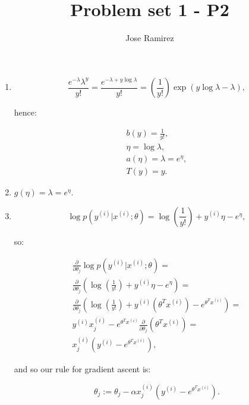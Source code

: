 \documentclass{article}
\title{Problem set 1 - P2}
\author{Jose Ramirez}
\begin{document}
\maketitle

\begin{enumerate}

\item
$$
	\frac{e^{-\lambda}\lambda^{y}}{y!} =
	\frac{e^{-\lambda + y\log\lambda}}{y!} =
	\left(\frac{1}{y!}\right) \exp(y\log\lambda -\lambda),
$$

hence:

\begin{align*}
	b(y) = \frac{1}{y!}, \\
	\eta = \log \lambda, \\
	a(\eta) = \lambda = e^{\eta}, \\
	T(y) = y.
\end{align*}

\item $g(\eta) = \lambda = e^{\eta}$.

\item
$$
	\log p(y^{(i)}|x^{(i)}; \theta) = \log(\frac{1}{y!}) + y^{(i)}\eta - e^{\eta},
$$

so:

\begin{align*}
	\frac{\partial}{\partial \theta_{j}}\log p(y^{(i)}|x^{(i)}; \theta) = \\
	\frac{\partial}{\partial \theta_{j}}\left(\log \left(\frac{1}{y!}\right) + y^{(i)}\eta - e^{\eta}\right) = \\
	\frac{\partial}{\partial \theta_{j}}\left(\log \left(\frac{1}{y!}\right) + y^{(i)}(\theta^Tx^{(i)}) - e^{\theta^Tx^{(i)}}\right) = \\
	y^{(i)}x^{(i)}_{j} - e^{\theta^Tx^{(i)}} \frac{\partial}{\partial \theta_{j}}(\theta^Tx^{(i)}) = \\
	x^{(i)}_{j}(y^{(i)} - e^{\theta^Tx^{(i)}}),
\end{align*}

and so our rule for gradient ascent is:

$$
	\theta_{j} := \theta_{j} - \alpha x^{(i)}_{j} (y^{(i)} - e^{\theta^Tx^{(i)}}).
$$
\end{enumerate}
\end{document}
